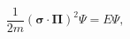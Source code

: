 \begin{equation}
\frac{1}{2m}\left( \boldsymbol{\sigma} \cdot \boldsymbol{\Pi} \right)
^{2}\Psi=E\Psi ,
\end{equation}

